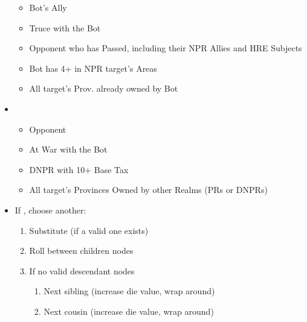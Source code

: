 \documentclass[10pt]{article}
\begin{document}
\begin{itemize}
\begin{itemize}
		\item Bot's Ally
		\item Truce with the Bot
		\item Opponent who has Passed, including their NPR Allies and HRE Subjects 
		\item Bot has 4+ \influence in NPR target's Areas
		\item All target's Prov. already owned by Bot
	\end{itemize}
	\item {}
	\begin{itemize}
		\item Opponent
		\item At War with the Bot
		\item DNPR with 10+ Base Tax
		\item All target's Provinces Owned by other Realms (PRs or DNPRs)
	\end{itemize}
	\item If , choose another:
	\begin{enumerate}
		\item Substitute (if a valid one exists)
		\item Roll between children nodes
		\item If no valid descendant nodes
		\begin{enumerate}[label=\arabic*.]
			\item Next sibling (increase die value, wrap around)
			\item Next cousin (increase die value, wrap around)
		\end{enumerate}
	\end{enumerate}
\end{itemize}
\end{document}
